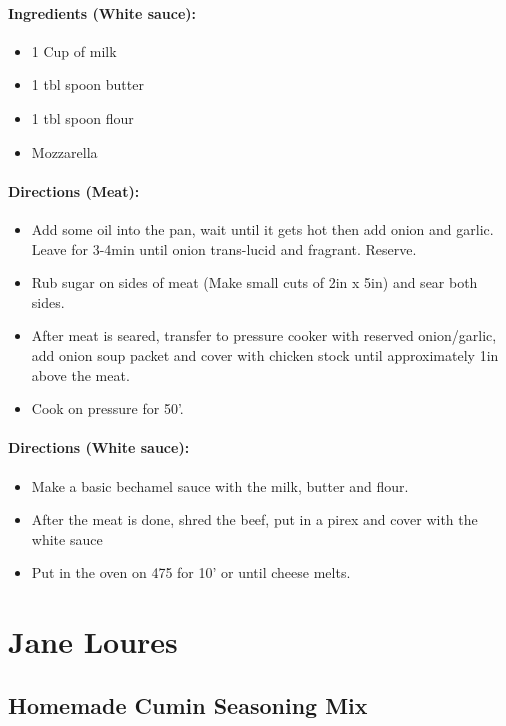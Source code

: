 \documentclass{article}
\begin{document}
\paragraph{Ingredients (White sauce):}
\begin{itemize}
    \item 1 Cup of milk
    \item 1 tbl spoon butter
    \item 1 tbl spoon flour
    \item Mozzarella
\end{itemize}  

\paragraph{Directions (Meat):}
\begin{itemize}
    \item Add some oil into the pan, wait until it gets hot then add onion and garlic. Leave for 3-4min until onion trans-lucid and fragrant. Reserve.
    \item Rub sugar on sides of meat (Make small cuts of 2in x 5in) and sear both sides.
    \item After meat is seared, transfer to pressure cooker with reserved onion/garlic, add onion soup packet and cover with chicken stock until approximately 1in above the meat.
    \item Cook on pressure for 50'.
\end{itemize}  

\paragraph{Directions (White sauce):}
\begin{itemize}
    \item Make a basic bechamel sauce with the milk, butter and flour.
    \item After the meat is done, shred the beef, put in a pirex and cover with the white sauce
    \item Put in the oven on 475 for 10' or until cheese melts.
\end{itemize} 

\section{Jane Loures}


\subsection{Homemade Cumin Seasoning Mix}
\end{document}
